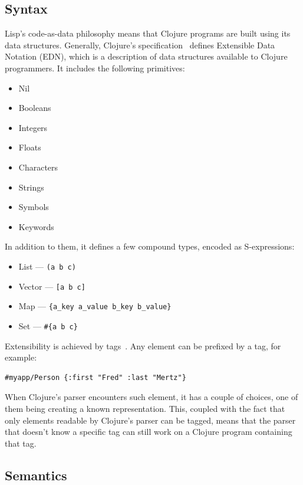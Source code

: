\documentclass[11pt]{scrartcl}
\begin{document}
\subsection{Syntax}
Lisp’s code-as-data philosophy means that Clojure programs are built using its
data structures.
Generally, Clojure’s specification~\cite{clojure_spec} defines Extensible Data Notation
(EDN), which is a description of data structures available to Clojure
programmers.
It includes the following primitives:
\begin{itemize}
  \item Nil
  \item Booleans
  \item Integers
  \item Floats
  \item Characters
  \item Strings
  \item Symbols
  \item Keywords
\end{itemize}
In addition to them, it defines a few compound types, encoded as S-expressions:
\begin{itemize}
  \item List --- \lstinline$(a b c) $
  \item Vector --- \lstinline$[a b c]$
  \item Map --- \lstinline|{a_key a_value b_key b_value}|
  \item Set --- \lstinline$#{a b c}$
\end{itemize}
Extensibility is achieved by tags~\cite{edn_format}. Any element can be
prefixed by a tag, for example:
\begin{lstlisting}
#myapp/Person {:first "Fred" :last "Mertz"} 
\end{lstlisting}
When Clojure’s parser encounters such element, it has a couple of choices, one
of them being creating a known representation.
This, coupled with the fact that only elements readable by Clojure’s parser can
be tagged, means that the parser that doesn’t know a specific tag can still work
on a Clojure program containing that tag.


\subsection{Semantics}
\end{document}
